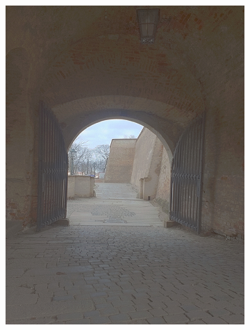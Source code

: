 \begin{figure}[h!]
  \centering
  \begin{subfigure}{0.3\textwidth}
      \includegraphics[width=\textwidth]{figures/tests/tmo/dur2}
  \end{subfigure}
  ~
  \begin{subfigure}{0.3\textwidth}

\end{subfigure}
\end{figure}

